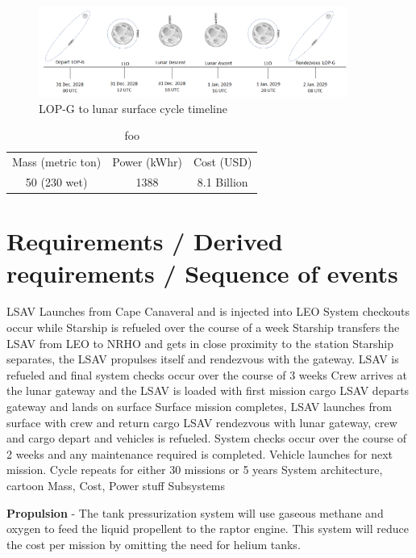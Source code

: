 \documentclass[10pt]{article}
\begin{document}
\begin{figure}[H]
  \centering
  \includegraphics[width=0.9\textwidth]{toon2}
  \caption{LOP-G to lunar surface cycle timeline}
  \label{fig:toon2}
\end{figure}

\begin{table}
  \centering
  \caption{foo}
  \label{table:foo}
  \begin{tabular}{ccc}
    Mass (metric ton) & Power (kWhr) & Cost (USD) \\
    50 (230 wet) & 1388 & 8.1 Billion \\
  \end{tabular}
\end{table}

\section{Requirements / Derived  requirements / Sequence
  of events}

LSAV Launches from Cape Canaveral and is injected into LEO System
checkouts occur while Starship is refueled over the course of a week
Starship transfers the LSAV from LEO to NRHO and gets in close
proximity to the station Starship separates, the LSAV propulses itself
and rendezvous with the gateway.  LSAV is refueled and final system
checks occur over the course of 3 weeks Crew arrives at the lunar
gateway and the LSAV is loaded with first mission cargo LSAV departs
gateway and lands on surface Surface mission completes, LSAV launches
from surface with crew and return cargo LSAV rendezvous with lunar
gateway, crew and cargo depart and vehicles is refueled.  System
checks occur over the course of 2 weeks and any maintenance required
is completed.  Vehicle launches for next mission.  Cycle repeats for
either 30 missions or 5 years System architecture, cartoon Mass, Cost,
Power stuff Subsystems

\textbf{Propulsion} - The tank pressurization system will use gaseous methane
and oxygen to feed the liquid propellent to the raptor engine. This
system will reduce the cost per mission by omitting the need for
helium tanks.
\end{document}
